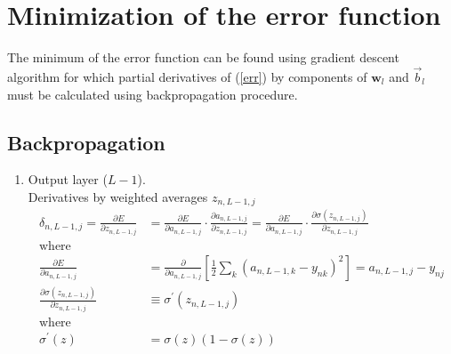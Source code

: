 \documentclass[10pt]{article}
\begin{document}
\section{Minimization of the error function}
The minimum of the error function can be found using gradient descent algorithm for which partial derivatives of (\ref{err}) by components of  $\textbf{w}_l$ and $\vec {b}_l$ must be calculated using backpropagation procedure.
\subsection{Backpropagation}
\begin{enumerate}
\item Output layer ($L-1$). \\
Derivatives by weighted averages $z_{n,L-1,j}$
\begin{align}
\delta_{n,L-1,j} = \frac{\partial E}{\partial z_{n,L-1,j}} &= \frac{\partial E}{\partial a_{n,L-1,j}} \cdot \frac{\partial a_{n,L-1,j}}{\partial z_{n,L-1,j}} 
=  \frac{\partial E}{\partial a_{n,L-1,j}} \cdot \frac{\partial \sigma(z_{n,L-1,j})}{\partial z_{n,L-1,j}} \\
\nonumber \text{where}\\
\frac{\partial E}{\partial a_{n,L-1,j}} &= \frac{\partial }{\partial a_{n,L-1,j}} 
\left[ \frac{1}{2}\sum_k \left( a_{n,L-1,k} - y_{nk}  \right)^2    \right] = a_{n,L-1,j} - y_{nj}\\
\frac{\partial \sigma(z_{n,L-1,j})}{\partial z_{n,L-1,j}} &\equiv \sigma^{'}(z_{n,L-1,j}) \\
\nonumber \text{where}\\
 \sigma^{'}(z) &= \sigma(z)(1- \sigma(z))
\end{align} 


\end{enumerate}
\end{document}
